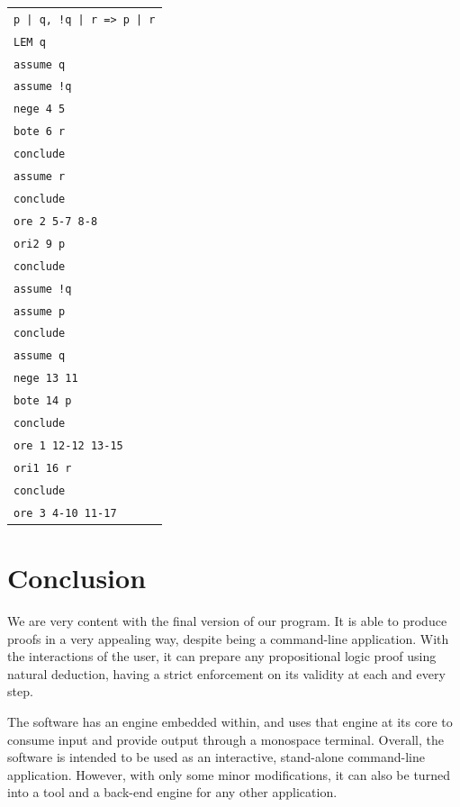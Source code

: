 \documentclass{article}
\begin{document}
\begin{center}
	\begin{tabular}{l}
		\verb^p | q, !q | r => p | r^\\
		\verb^LEM q^\\
		\verb^assume q^\\
		\verb^assume !q^\\
		\verb^nege 4 5^\\
		\verb^bote 6 r^\\
		\verb^conclude^\\
		\verb^assume r^\\
		\verb^conclude^\\
		\verb^ore 2 5-7 8-8^\\
		\verb^ori2 9 p^\\
		\verb^conclude^\\
		\verb^assume !q^\\
		\verb^assume p^\\
		\verb^conclude^\\
		\verb^assume q^\\
		\verb^nege 13 11^\\
		\verb^bote 14 p^\\
		\verb^conclude^\\
		\verb^ore 1 12-12 13-15^\\
		\verb^ori1 16 r^\\
		\verb^conclude^\\
		\verb^ore 3 4-10 11-17^
	\end{tabular}
\end{center}

\section{Conclusion}

We are very content with the final version of our program. It is able
to produce proofs in a very appealing way, despite being a command-line
application. With the interactions of the user, it can prepare any
propositional logic proof using natural deduction, having a strict
enforcement on its validity at each and every step.

The software has an engine embedded within, and uses that engine at its
core to consume input and provide output through a monospace terminal.
Overall, the software is intended to be used as an interactive, stand-alone
command-line application. However, with only some minor modifications,
it can also be turned into a tool and a back-end engine for any other
application.

 

\end{document}
